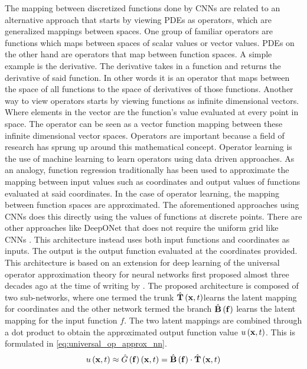 The mapping between discretized functions done by CNNs are related to an alternative approach that starts by viewing PDEs as operators, which are generalized mappings between spaces. One group of familiar operators are functions which maps between spaces of scalar values or vector values. PDEs on the other hand are operators that map between function spaces. A simple example is the derivative. The derivative takes in a function and returns the derivative of said function. In other words it is an operator that maps between the space of all functions to the space of derivatives of those functions. Another way to view operators starts by viewing functions as infinite dimensional vectors. Where elements in the vector are the function's value evaluated at every point in space. The operator can be seen as a vector function mapping between these infinite dimensional vector spaces. Operators are important because a field of research has sprung up around this mathematical concept. Operator learning is the use of machine learning to learn operators using data driven approaches. As an analogy, function regression traditionally has been used to approximate the mapping between input values such as coordinates and output values of functions evaluated at said coordinates. In the case of operator learning, the mapping between function spaces are approximated. The aforementioned approaches using CNNs does this directly using the values of functions at discrete points. There are other approaches like DeepONet that does not require the uniform grid like CNNs \autocite{luLearningNonlinearOperators2021}. This architecture instead uses both input functions and coordinates as inputs. The output is the output function evaluated at the coordinates provided. This architecture is based on an extension for deep learning of the universal operator approximation theory for neural networks first proposed almost three decades ago at the time of writing by \textcite{chenUniversalApproximationNonlinear1995}. The proposed architecture is composed of two sub-networks, where one termed the trunk \(\hat{\vb{T}}\left(\vb{x},t\right)\)learns the latent mapping for coordinates and the other network termed the branch \(\hat{\vb{B}}\left(\vb{f}\right)\) learns the latent mapping for the input function \(f \). The two latent mappings are combined through a dot product to obtain the approximated output function value \(u \left( \vb{x}, t \right)\). This is formulated in \cref{eq:universal_op_approx_nn}.
\begin{equation}\label{eq:universal_op_approx_nn}
    u\left( \vb{x}, t \right) \approx \hat{G}\left( \vb{f} \right)\left( \vb{x}, t \right) = \hat{\vb{B}}\left( \vb{f} \right) \cdot \hat{\vb{T}}\left( \vb{x}, t \right)
\end{equation}
